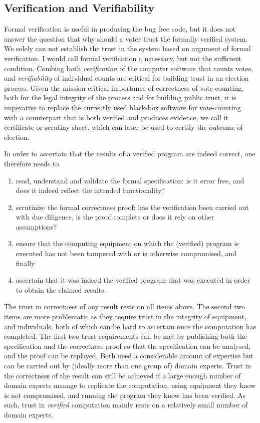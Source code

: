  \subsection{Verification and Verifiability}
   Formal verification is useful in producing the 
   bug free code, but it does not answer the question that 
   why should a voter trust the formally verified system. We solely can not 
   establish the trust in the system based on argument of 
   formal verification.  I would call formal verification a necessary, but not the sufficient condition. 
   Combing both \emph{verification} of the
	computer software that counts votes, and
	\emph{verifiability} of individual counts are critical for
	building trust in an election process.  Given the mission-critical importance of
	 correctness of vote-counting,
	both for the legal integrity of the process and for
	building public trust,  it is imperative to replace the
	currently used black-box software for vote-counting with a
	counterpart that is both verified and produces 
	evidence, we call it certificate or scrutiny sheet, which can later be used to certify
	the outcome of election.
	
In order to ascertain that the results of a verified program are
indeed correct, one therefore needs to
\begin{enumerate}
\item read, understand and validate the formal specification: is it
error free, and does it indeed reflect the intended functionality?
\item scrutinize the formal correctness proof: has the verification
been carried out with due diligence, is the proof complete or does
it rely on other assumptions?
\item ensure that the computing equipment on which the (verified)
program is executed has not been tampered with or is otherwise
compromised, and finally
\item ascertain that it was indeed the verified program that was
executed in order to obtain the claimed results.
\end{enumerate}

\noindent
The trust in correctness of any result rests on all items above.
The second two items are
more problematic as they require trust in the integrity of
equipment, and individuals, both of which can be hard to ascertain
once the computation has completed. The
first two trust requirements can be met by publishing both the
specification and the correctness proof so that the specification
can be analysed, and the proof can be replayed. Both need a
considerable amount of expertise but can be carried out by (ideally
more than one group of) domain experts. Trust in the correctness of the
result can still be achieved if a large enough number of domain
experts manage to replicate the computation, using equipment they
know is not compromised, and running the program they know has been
verified. As such, trust in \emph{verified} computation mainly rests
on a relatively small number of domain experts.
   
